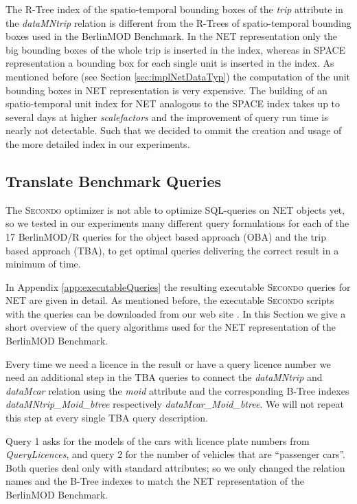 \documentclass[a4paper]{article}
\newcommand{\secondo}{\textsc{Secondo}}
\newcommand{\bmodb} {BerlinMOD Benchmark}
\begin{document}
The R-Tree index of the spatio-temporal bounding boxes of the \textit{trip}
attribute in the \textit{dataMNtrip} relation is different from the
R-Trees of spatio-temporal bounding boxes used in the \bmodb{}.
In the NET representation only the big bounding boxes of the whole trip is
inserted in the index, whereas in SPACE representation a bounding box for each 
single unit is inserted in the index. As mentioned before (see Section
\ref{sec:implNetDataTyp}) the computation of the unit bounding boxes in NET 
representation is very expensive. The building of an spatio-temporal unit index 
for NET analogous to the SPACE index takes up to several days at higher 
\textit{scalefactors} and the improvement of query run time is nearly not detectable.
Such that we decided to ommit the creation and usage of the more detailed index
in our experiments.
\subsection{Translate Benchmark Queries}
\label{sec:queries}
The \secondo{} optimizer is not able to optimize SQL-queries on NET objects yet,
so we tested in our experiments many different query formulations for each of
the 17 BerlinMOD/R queries for the object based approach (OBA) and the trip based
approach (TBA), to get optimal queries delivering the correct result in a minimum
of time.

In Appendix \ref{app:executableQueries} the resulting executable
\secondo{} queries for NET are given in detail. As mentioned before, the 
executable \secondo{} scripts with the queries can be downloaded from our 
web site \cite{NetworkWeb}.
In this Section we give a short overview of the query algorithms used for the
NET representation of the \bmodb{}.

Every time we need a licence in the result or have a query licence number we
need
an additional step in the TBA queries to connect the \textit{dataMNtrip} and
\textit{dataMcar}
relation using the \textit{moid} attribute and the corresponding B-Tree indexes
\textit{dataMNtrip\_Moid\_btree} respectively \textit{dataMcar\_Moid\_btree}.
We will not repeat this step at every single TBA query description.

Query 1 asks for the models of the cars with licence plate numbers from
\textit{QueryLicences},
and query 2 for the number of vehicles that are ``passenger cars''. Both queries
deal only with standard attributes; so we only changed the relation names and
the
B-Tree indexes to match the NET representation of the \bmodb{}.
\end{document}
